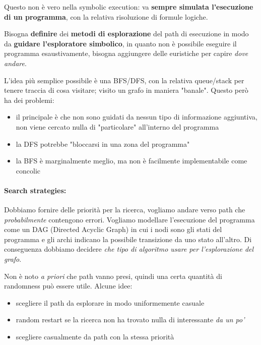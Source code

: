 Questo non è vero nella symbolic execution: va \textbf{sempre simulata l'esecuzione di un programma}, con la relativa risoluzione di formule logiche.

Bisogna \textbf{definire} dei \textbf{metodi di esplorazione} del path di esecuzione in modo da \textbf{guidare l'esploratore simbolico}, in quanto non è possibile eseguire il programma esaustivamente, bisogna aggiungere delle euristiche per capire \textit{dove andare}. 

L'idea più semplice possibile è una BFS/DFS, con la relativa queue/stack per tenere traccia di cosa visitare; visito un grafo in maniera "banale". Questo però ha dei problemi: 
\begin{itemize}
	\item il principale è che non sono guidati da nessun tipo di informazione aggiuntiva, non viene cercato nulla di "particolare" all'interno del programma
    
	\item la DFS potrebbe "bloccarsi in una zona del programma"
	
    \item la BFS è marginalmente meglio, ma non è facilmente implementabile come concolic
\end{itemize}

\paragraph{Search strategies:} Dobbiamo fornire delle priorità per la ricerca, vogliamo andare verso path che \textit{probabilmente} contengono errori. Vogliamo modellare l'esecuzione del programma come un DAG (Directed Acyclic Graph) in cui i nodi sono gli stati del programma e gli archi indicano la possibile transizione da uno stato all'altro. Di conseguenza dobbiamo decidere \textit{che tipo di algoritmo usare per l'esplorazione del grafo}.

Non è noto \textit{a priori} che path vanno presi, quindi una certa quantità di randomness può essere utile. Alcune idee:
\begin{itemize}
	\item scegliere il path da esplorare in modo uniformemente casuale
    
	\item random restart se la ricerca non ha trovato nulla di interessante \textit{da un po'}

	\item scegliere casualmente da path con la stessa priorità
\end{itemize}

